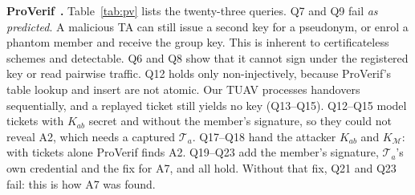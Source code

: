 \documentclass[conference]{IEEEtran}
\begin{document}
\textbf{ProVerif}~\cite{proverif}\textbf{.} Table~\ref{tab:pv} lists the twenty-three queries. Q7 and Q9 fail \emph{as predicted}. A malicious TA can still issue a second key for a pseudonym,
or enrol a phantom member and receive the group key. This is inherent to certificateless schemes and detectable. Q6 and Q8 show that it cannot sign under the
registered key or read pairwise traffic. Q12 holds only non-injectively, because ProVerif's table lookup and insert are not atomic. Our TUAV processes
handovers sequentially, and a replayed ticket still yields no key (Q13--Q15). Q12--Q15 model tickets with $K_{ab}$ secret and without the member's signature, so they
could not reveal A2, which needs a captured $\mathcal T_a$. Q17--Q18 hand the attacker $K_{ab}$ and $K_\mathcal M$: with tickets alone ProVerif finds A2. Q19--Q23 add the member's
signature, $\mathcal T_a$'s own credential and the fix for A7, and all hold. Without that fix, Q21 and Q23 fail: this is how A7 was found.
\end{document}
